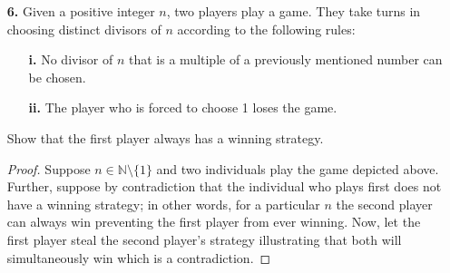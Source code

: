 \documentclass[ 12pt ]{article}
\begin{document}
\begin{enumerate}
	\item[\textbf{6.}] Given a positive integer $n$, two players play a game. They take turns in choosing distinct divisors of $n$ according to the following rules:
		\begin{enumerate}
			\item[\textbf{i.}] No divisor of $n$ that is a multiple of a previously mentioned number can be chosen.
			\item[\textbf{ii.}] The player who is forced to choose 1 loses the game.
		\end{enumerate}
		Show that the first player always has a winning strategy.

		\begin{proof}
			Suppose $n \in \mathbb{N} \setminus \{ 1 \}$ and two individuals play the game depicted above. Further, suppose by contradiction that the individual who plays first does not
			have a winning strategy; in other words, for a particular $n$ the second player can always win preventing the first player from ever winning. Now, let the first player steal
			the second player's strategy illustrating that both will simultaneously win which is a contradiction.
		\end{proof}
\end{enumerate}
\end{document}
